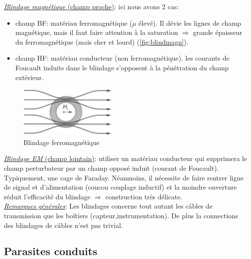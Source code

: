 \underline{\textit{Blindage magnétique} (champ proche)}: ici nous avons 2 cas:
\begin{itemize}
	\item champ BF: matériau ferromagnétique (\(\mu\) élevé). Il dévie les lignes de champ magnétique, mais il faut faire attention à la saturation \(\Rightarrow\) grande épaisseur du ferromagnétique (mais cher et lourd) (\autoref{fig:blindmagn}).
	\item champ HF: matériau conducteur (non ferromagnétique). les courants de Foucault induits dans le blindage s'opposent à la pénétration du champ extérieur.
\end{itemize}
\begin{figure}[H] 
	\centering 
	\includegraphics[height=4\baselineskip]{ch3/image8} 
	\caption{Blindage ferromagnétique}
	\label{fig:blindmagn}
\end{figure}

\underline{\textit{Blindage EM} (champ lointain)}: utiliser un matériau conducteur qui supprimera le champ perturbateur par un champ opposé induit (courant de Foucault). Typiquement, une cage de Faraday. Néanmoins, il nécessite de faire rentrer ligne de signal et d'alimentation (coucou couplage inductif) et la moindre ouverture réduit l'efficacité du blindage \(\Rightarrow\) construction très délicate.\\

\underline{\textit{Remarques générales}}: Les blindages concerne tout autant les câbles de transmission que les boîtiers (capteur,instrumentation). De plus la connections des blindages de câbles n'est pas trivial.
\subsection{Parasites conduits}
